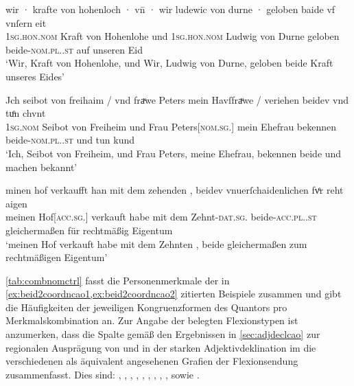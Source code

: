 \begin{exe}
\ex \label{ex:beid2coordncao2}
	\begin{xlist}
	\ex \label{ex:beid2coordncao2_1}
		\gll wir · krafte von hohenloch · vn̄ · wir ludewic
			von durne · geloben baide vf vnſern eit \\
			\textsc{1sg\subM.hon.nom} {} Kraft von Hohenlohe {} und {}
			\textsc{1sg\subM.hon.nom} Ludwig von Durne {} geloben
			beide-\textsc{nom.pl.\MascM.st} auf unseren Eid \\
		\trans `Wir, Kraft von Hohenlohe, und Wir, Ludwig von Durne,
			geloben beide Kraft unseres Eides'
			\parencites(Nr.~2529, Burg Hohlach, Kr.~Neustadt an der Aisch-Bad Windsheim)[563,5--6]{cao3}

	\ex \label{ex:beid2coordncao2_2}
		\gll Jch seibot von freihaim / vnd fraͮwe Peters mein
			Havſfraͮwe / veriehen beidev vnd tuͦn chvnt \\
			\textsc{1sg\subM.nom} Seibot von Freiheim {} und Frau
			Peters[\textsc{nom.sg.\FemF}] mein Ehefrau {} bekennen
			beide-\textsc{nom.pl.\NeutMF.st} und tun kund \\
		\trans `Ich, Seibot von Freiheim, und Frau Peters, meine Ehefrau,
			bekennen beide und machen bekannt'
			\parencites(Nr.~3248, München, 1299)[416,23]{cao4}

	\ex \label{ex:beid2coordncao2_3}
		\gll minen hof \textelp{} verkaufft han mit dem
			zehenden \textelp{}, beidev vnuerſchaidenlichen
			fvͤr reht aigen \\
			meinen Hof[\textsc{acc.sg.\MascI}] {} verkauft habe mit dem
			Zehnt-\textsc{dat.sg.\MascI} {} beide-\textsc{acc.pl.\NeutI.st}
			gleichermaßen für rechtmäßig Eigentum \\
		\trans `meinen Hof verkauft habe mit dem Zehnten \textelp{}, beide
			gleichermaßen zum rechtmäßigen Eigentum'
			\parencites(Nr.~N~241, Augsburg, 1283)[195,37--39]{cao5}
	\end{xlist}
\end{exe}

\cref{tab:combnomctrl} fasst die Personenmerkmale der in
\cref{ex:beid2coordncao1,ex:beid2coordncao2} zitierten Beispiele zusammen und
gibt die Häufigkeiten der jeweiligen Kongruenzformen des Quantors pro
Merkmalskombination an. Zur Angabe der belegten Flexionstypen ist anzumerken,
dass die Spalte  gemäß den Ergebnissen in \cref{sec:adjdeclcao}
zur regionalen Ausprägung von  und  in der starken
Adjektivdeklination im \CAO{} die verschiedenen als äquivalent
angesehenen Grafien der Flexionsendung zusammenfasst. Dies sind:
,
,
,
,
,
,
,
,
,
sowie
.

